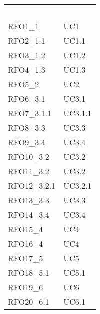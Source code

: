 \renewcommand{\arraystretch}{1.5}


\begin{longtable}{C{6cm} C{3cm}} 
	
	\textcolor{white}{\textbf{Requisiti}} &
	\textcolor{white}{\textbf{Fonte}} \\
	
	RFO1\_1 & UC1 \\

	RFO2\_1.1 & UC1.1 \\
	
	RFO3\_1.2 & UC1.2 \\
	
	RFO4\_1.3 & UC1.3 \\
	
	RFO5\_2 & UC2 \\

	RFO6\_3.1 & UC3.1 \\
	
	RFO7\_3.1.1 & UC3.1.1 \\

	RFO8\_3.3 & UC3.3 \\

	RFO9\_3.4 & UC3.4 \\

	RFO10\_3.2 & UC3.2 \\
	
	RFO11\_3.2 & UC3.2 \\
	
	RFO12\_3.2.1 & UC3.2.1 \\

	RFO13\_3.3 & UC3.3 \\

	RFO14\_3.4 & UC3.4 \\

    RFO15\_4 & UC4 \\
    
    RFO16\_4 & UC4 \\

    RFO17\_5 & UC5 \\
    
    RFO18\_5.1 & UC5.1 \\
    
    RFO19\_6 & UC6\\
    
    RFO20\_6.1 & UC6.1 \\
    

\end{longtable}
